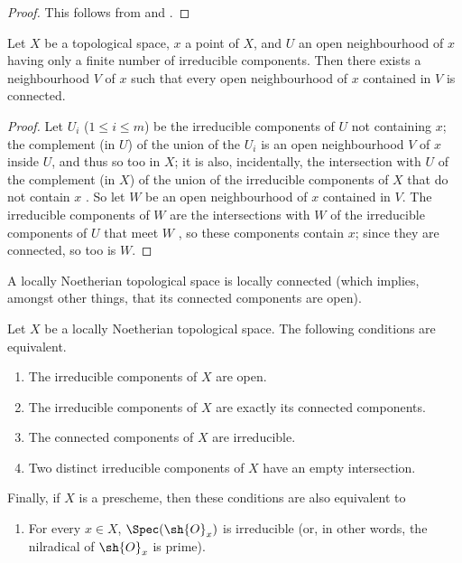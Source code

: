 \begin{proof}
This follows from  and .
\end{proof}

\begin{lemma}[6.1.8]
\label{I.6.1.8}
Let $X$ be a topological space, $x$ a point of $X$, and $U$ an open neighbourhood of $x$ having only a finite number of irreducible components.
Then there exists a neighbourhood $V$ of $x$ such that every open neighbourhood of $x$ contained in $V$ is connected.
\end{lemma}

\begin{proof}
Let $U_i$ ($1\leq i\leq m$) be the irreducible components of $U$ not containing $x$;
the complement (in $U$) of the union of the $U_i$ is an open neighbourhood $V$ of $x$ inside $U$, and thus so too in $X$;
it is also, incidentally, the intersection with $U$ of the complement (in $X$) of the union of the irreducible components of $X$ that do not contain $x$ .
So let $W$ be an open neighbourhood of $x$ contained in $V$.
The irreducible components of $W$ are the intersections with $W$ of the irreducible components of $U$ that meet $W$ , so these components contain $x$;
since they are connected, so too is $W$.
\end{proof}

\begin{corollary}[6.1.9]
\label{I.6.1.9}
A locally Noetherian topological space is locally connected (which implies, amongst other things, that its connected components are open).
\end{corollary}

\begin{proposition}[6.1.10]
\label{I.6.1.10}
Let $X$ be a locally Noetherian topological space.
The following conditions are equivalent.
\begin{enumerate}
  \item[{\rm(a)}] The irreducible components of $X$ are open.
  \item[{\rm(b)}] The irreducible components of $X$ are exactly its connected components.
  \item[{\rm(c)}] The connected components of $X$ are irreducible.
  \item[{\rm(d)}] Two distinct irreducible components of $X$ have an empty intersection.
\end{enumerate}
Finally, if $X$ is a prescheme, then these conditions are also equivalent to
\begin{enumerate}
  \item[{\rm(e)}] For every $x\in X$, $\Spec(\sh{O}_x)$ is irreducible (or, in other words, the nilradical of $\sh{O}_x$ is prime).
\end{enumerate}
\end{proposition}

